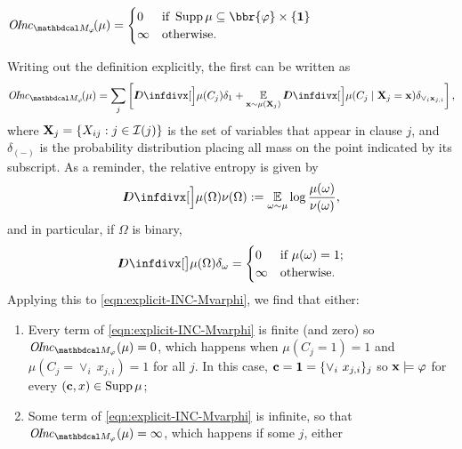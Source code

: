 \begin{lproof}
	\begin{iclaim} \label{claim:separate-inc-varphi}
		$\OInc_{\dg M_\varphi}\!(\mu) =
		\begin{cases}
			0 & \text{if}~  \Supp \mu \subseteq \bbr{\varphi} \times \{ \mat 1\} \\
			\infty & \text{otherwise.}
		\end{cases}$
	\end{iclaim}
	\vspace{-1em}
	\begin{lproof}
		Writing out the definition explicitly, the first can be written as
		\begin{equation}
			\OInc_{\dg M_\varphi}\!(\mu) = \sum_{j} \left[ \kldiv[\Big]{\mu(C_j)}{\delta_1} +
				\Ex_{\mat x \sim \mu(\mat X_j)} \kldiv[\Big]{\mu(C_j \mid \mat X_j = \mat x)}{\delta_{\lor_i \mat x_{j,i}}} \right], \label{eqn:explicit-INC-Mvarphi}
		\end{equation}
		where $\mathbf X_j = \{X_{ij} : j \in \mathcal I(j)\}$ is the set of variables that
		appear in clause $j$, and $\delta_{(-)}$ is the probability distribution placing all mass on the point indicated by its subscript.
		As a reminder, the relative entropy is given by
		\[ \kldiv[\Big]{\mu(\Omega)}{\nu(\Omega)} := \Ex_{\omega \sim \mu} \log \frac{\mu(\omega)}{\nu(\omega)},
        \]
        and in particular, if $\Omega$ is binary, 
        \[
			\kldiv[\big]{\mu(\Omega)}{\delta_\omega} = \begin{cases}
				0 &  \text{if}~\mu(\omega) = 1 ; \\
				\infty & \text{otherwise}.
		\end{cases} \]
		Applying this to \eqref{eqn:explicit-INC-Mvarphi}, we find that either:
		\begin{enumerate}[itemsep=0pt]
			\item Every term of \eqref{eqn:explicit-INC-Mvarphi} is finite (and zero) so $\OInc_{\dg M_\varphi}(\mu) = 0$, which happens when $\mu(C_j = 1) = 1$ and $\mu(C_j = \vee_i~ x_{j,i}) = 1$ for all $j$.  In this case, $\mathbf c = \mathbf 1 = \{ \vee_i~x_{j,i} \}_j$ so $\mathbf x \models \varphi$ for every $(\mathbf c,x) \in \operatorname{\mathrm{Supp}} \mu$;
			\item Some term of \eqref{eqn:explicit-INC-Mvarphi} is infinite, so that $\OInc_{\dg M_\varphi}(\mu) = \infty$, which happens if some $j$, either


\end{enumerate}
\end{lproof}
\end{lproof}
